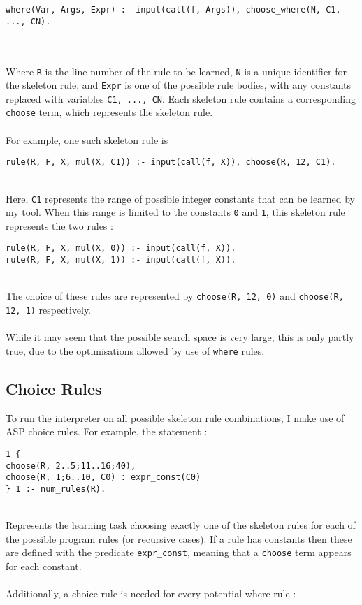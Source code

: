 \begin{lstlisting}
where(Var, Args, Expr) :- input(call(f, Args)), choose_where(N, C1, ..., CN).
\end{lstlisting}
\mbox{} \\ \\
Where \lstinline!R! is the line number of the rule to be learned, \lstinline!N! is a unique identifier for the skeleton rule, and \lstinline!Expr! is one of the possible rule bodies, with any constants replaced with variables \lstinline!C1, ..., CN!. Each skeleton rule contains a corresponding \lstinline!choose! term, which represents the skeleton rule. \\ \\
For example, one such skeleton rule is \\

\begin{lstlisting}
rule(R, F, X, mul(X, C1)) :- input(call(f, X)), choose(R, 12, C1).
\end{lstlisting}
\mbox{}\\
Here, \lstinline!C1! represents the range of possible integer constants that can be learned by my tool. When this range is limited to the constants \lstinline!0! and \lstinline!1!, this skeleton rule represents the two rules : \\

\begin{lstlisting}
rule(R, F, X, mul(X, 0)) :- input(call(f, X)).
rule(R, F, X, mul(X, 1)) :- input(call(f, X)).
\end{lstlisting}
\mbox{}\\
The choice of these rules are represented by \lstinline!choose(R, 12, 0)! and \lstinline!choose(R, 12, 1)! respectively. \\ \\
While it may seem that the possible search space is very large, this is only partly true, due to the optimisations allowed by use of \lstinline!where! rules.

\subsection{Choice Rules}
To run the interpreter on all possible skeleton rule combinations, I make use of ASP choice rules. For example, the statement :\\

\begin{lstlisting}
1 {
choose(R, 2..5;11..16;40),
choose(R, 1;6..10, C0) : expr_const(C0)
} 1 :- num_rules(R).
\end{lstlisting}
\mbox{} \\
Represents the learning task choosing exactly one of the skeleton rules for each of the possible program rules (or recursive cases). If a rule has constants then these are defined with the predicate \lstinline!expr_const!, meaning that a \lstinline!choose! term appears for each constant. \\ \\
Additionally, a choice rule is needed for every potential where rule : \\

